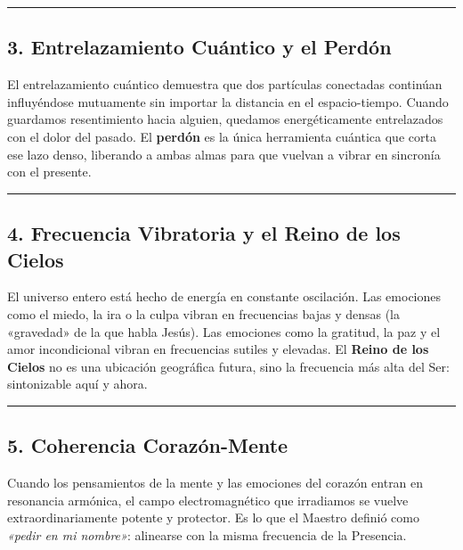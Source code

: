 \vspace{0.4cm}
\begin{center}
\rule{0.35\textwidth}{0.4pt}
\end{center}
\vspace{0.4cm}


\subsection*{3. Entrelazamiento Cuántico y el Perdón}
El entrelazamiento cuántico demuestra que dos partículas conectadas continúan influyéndose mutuamente sin importar la distancia en el espacio-tiempo. Cuando guardamos resentimiento hacia alguien, quedamos energéticamente entrelazados con el dolor del pasado. El \textbf{perdón} es la única herramienta cuántica que corta ese lazo denso, liberando a ambas almas para que vuelvan a vibrar en sincronía con el presente.


\vspace{0.4cm}
\begin{center}
\rule{0.35\textwidth}{0.4pt}
\end{center}
\vspace{0.4cm}


\subsection*{4. Frecuencia Vibratoria y el Reino de los Cielos}
El universo entero está hecho de energía en constante oscilación. Las emociones como el miedo, la ira o la culpa vibran en frecuencias bajas y densas (la «gravedad» de la que habla Jesús). Las emociones como la gratitud, la paz y el amor incondicional vibran en frecuencias sutiles y elevadas. El \textbf{Reino de los Cielos} no es una ubicación geográfica futura, sino la frecuencia más alta del Ser: sintonizable aquí y ahora.


\vspace{0.4cm}
\begin{center}
\rule{0.35\textwidth}{0.4pt}
\end{center}
\vspace{0.4cm}


\subsection*{5. Coherencia Corazón-Mente}
Cuando los pensamientos de la mente y las emociones del corazón entran en resonancia armónica, el campo electromagnético que irradiamos se vuelve extraordinariamente potente y protector. Es lo que el Maestro definió como \textit{«pedir en mi nombre»}: alinearse con la misma frecuencia de la Presencia.